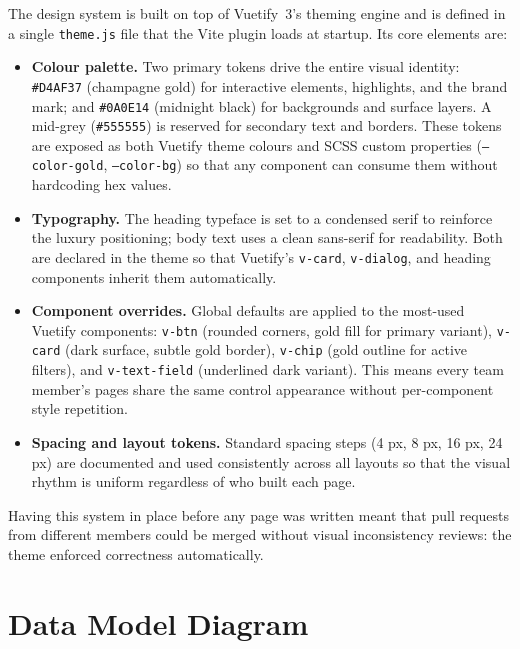 \documentclass[12pt,a4paper,oneside]{report}
\begin{document}
The design system is built on top of Vuetify~3's theming engine and is defined
in a single \texttt{theme.js} file that the Vite plugin loads at startup.
Its core elements are:

\begin{itemize}[leftmargin=1.5em, topsep=4pt, itemsep=4pt]
  \item \textbf{Colour palette.} Two primary tokens drive the entire
        visual identity: \texttt{\#D4AF37} (champagne gold) for interactive
        elements, highlights, and the brand mark; and \texttt{\#0A0E14}
        (midnight black) for backgrounds and surface layers.
        A mid-grey (\texttt{\#555555}) is reserved for secondary text and
        borders. These tokens are exposed as both Vuetify theme colours and
        SCSS custom properties (\texttt{--color-gold}, \texttt{--color-bg})
        so that any component can consume them without hardcoding hex values.

  \item \textbf{Typography.} The heading typeface is set to a condensed
        serif to reinforce the luxury positioning; body text uses a clean
        sans-serif for readability. Both are declared in the theme so that
        Vuetify's \texttt{v-card}, \texttt{v-dialog}, and heading components
        inherit them automatically.

  \item \textbf{Component overrides.} Global defaults are applied to the
        most-used Vuetify components: \texttt{v-btn} (rounded corners, gold
        fill for primary variant), \texttt{v-card} (dark surface, subtle
        gold border), \texttt{v-chip} (gold outline for active filters), and
        \texttt{v-text-field} (underlined dark variant). This means every
        team member's pages share the same control appearance without
        per-component style repetition.

  \item \textbf{Spacing and layout tokens.} Standard spacing steps
        (4 px, 8 px, 16 px, 24 px) are documented and used consistently
        across all layouts so that the visual rhythm is uniform regardless
        of who built each page.
\end{itemize}

Having this system in place before any page was written meant that pull
requests from different members could be merged without visual inconsistency
reviews: the theme enforced correctness automatically.

\section{Data Model Diagram}
\end{document}

